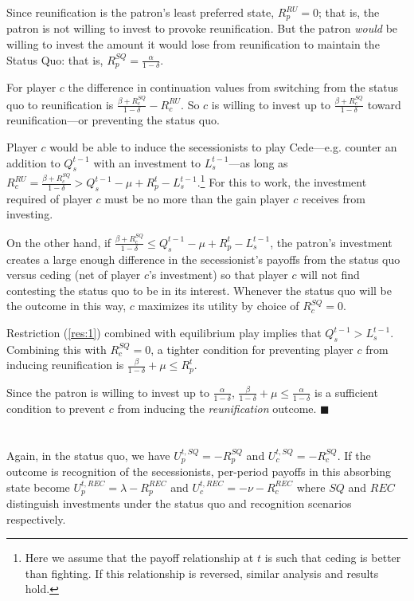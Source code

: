 \documentclass[11pt,letterpaper, notitlepage]{article}
\newcommand{\de}{\delta}
\begin{document}
Since reunification is the patron's least preferred state, $R_p^{RU} =0$; that is, the patron is not willing to invest to provoke reunification. But the patron \textit{would} be willing to invest the amount it would lose from reunification to maintain the Status Quo: that is, $R_p^{SQ} = \frac{\alpha}{1 -\de}$. 

For player $c$ the difference in continuation values from switching from the status quo to reunification is $\frac{\beta + R_c^{SQ}}{1 -\de} -R_c^{RU}$. So $c$ is willing to invest up to $\frac{\beta+ R_c^{SQ}}{1 -\de}$ toward reunification---or preventing the status quo.

Player $c$ would be able to induce the secessionists to play Cede---e.g. counter an addition to $Q_s^{t-1}$ with an investment to $L_s^{t-1}$---as long as $R_c^{RU} = \frac{\beta + R_c^{SQ}}{1 -\de} > Q_s^{t-1} -\mu + R_p^t - L_s^{t-1}$.\footnote{Here we assume that the payoff relationship at $t$ is such that ceding is better than fighting. If this relationship is reversed, similar analysis and results hold.} For this to work, the investment required of player $c$ must be no more than the gain player $c$ receives from investing.

On the other hand, if $\frac{\beta + R_c^{SQ}}{1 -\de} \leq Q_s^{t-1} -\mu + R_p^t - L_s^{t-1}$, the patron's investment creates a large enough difference in the secessionist's payoffs from the status quo versus ceding (net of player $c$'s investment) so that player $c$ will not find contesting the status quo to be in its interest. Whenever the status quo will be the outcome in this way, $c$ maximizes its utility by choice of $R_c^{SQ} =0$. 

Restriction (\ref{res:1}) combined with equilibrium play implies that  $Q_s^{t-1} > L_s^{t-1}$. Combining this with $R_c^{SQ} =0$, a tighter condition for preventing player $c$ from inducing reunification is $\frac{\beta}{1 -\de} + \mu \leq R_p^t$. 

Since the patron is willing to invest up to $\frac{\alpha}{1 -\de}$, $\frac{\beta}{1 -\de} + \mu \leq \frac{\alpha}{1 -\de}$ is a sufficient condition to prevent $c$ from inducing the \emph{reunification} outcome. \hfill $\blacksquare$
\\
\\
 \\
Again, in the status quo, we have $U_p^{t,SQ}= -R_p^{SQ}$ and $U_c^{t,SQ}= -R_c^{SQ}$. If the outcome is recognition of the secessionists, per-period payoffs in this absorbing state become $U_p^{t,REC}= \lambda -R_p^{REC}$ and $U_c^{t,REC}= -\nu -R_c^{REC}$ where $SQ$ and $REC$ distinguish investments under the status quo and recognition scenarios respectively.
\end{document}
